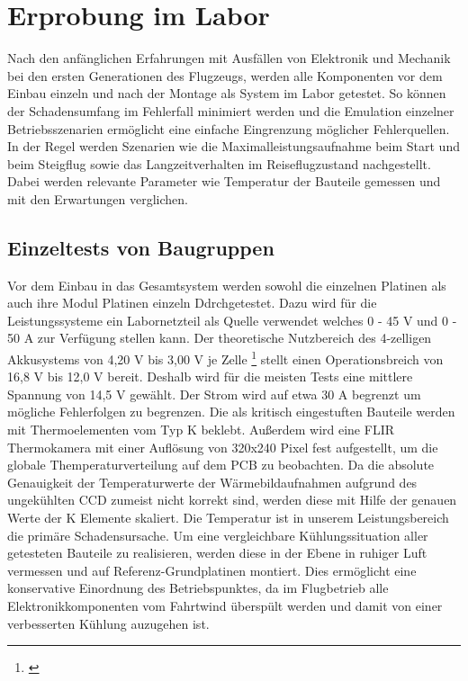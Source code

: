 \chapter{Erprobung im Labor}\label{cha:Erprobung im Labor}

Nach den anfänglichen Erfahrungen mit Ausfällen von Elektronik und Mechanik bei den ersten Generationen des Flugzeugs, werden alle Komponenten vor dem Einbau einzeln und nach der Montage als System im Labor getestet.
So können der Schadensumfang im Fehlerfall minimiert werden und die Emulation einzelner Betriebsszenarien ermöglicht eine einfache Eingrenzung möglicher Fehlerquellen.
In der Regel werden Szenarien wie die Maximalleistungsaufnahme beim Start und beim  Steigflug sowie das Langzeitverhalten im Reiseflugzustand nachgestellt. Dabei werden relevante Parameter wie Temperatur der Bauteile gemessen und mit den Erwartungen verglichen.

\section{Einzeltests von Baugruppen}

Vor dem Einbau in das Gesamtsystem werden sowohl die einzelnen Platinen als auch ihre Modul Platinen einzeln Ddrchgetestet.
Dazu wird für die Leistungssysteme ein Labornetzteil als Quelle verwendet welches 0 - 45 V und 0 - 50 A zur Verfügung stellen kann.
Der theoretische Nutzbereich des 4-zelligen Akkusystems von 4,20 V bis 3,00 V je Zelle \footnote{\cite[Seite~1.12f.]{Reddy2010}} stellt einen Operationsbreich von 16,8 V bis 12,0 V bereit. Deshalb wird für die meisten Tests eine mittlere Spannung von 14,5 V gewählt. Der Strom wird auf etwa 30 A begrenzt um mögliche Fehlerfolgen zu begrenzen.
Die als kritisch eingestuften Bauteile werden mit Thermoelementen vom Typ K beklebt. Außerdem wird eine FLIR Thermokamera mit einer Auflösung von 320x240 Pixel fest aufgestellt, um die globale Themperaturverteilung auf dem PCB zu beobachten.
Da die absolute Genauigkeit der Temperaturwerte der Wärmebildaufnahmen aufgrund des ungekühlten CCD zumeist nicht korrekt sind, werden diese mit Hilfe der genauen Werte der K Elemente skaliert.
Die Temperatur ist in unserem Leistungsbereich die primäre Schadensursache. 
Um eine vergleichbare Kühlungssituation aller getesteten Bauteile zu realisieren, werden diese in der Ebene in ruhiger Luft vermessen und auf Referenz-Grundplatinen montiert.
Dies ermöglicht eine konservative Einordnung des Betriebspunktes, da im Flugbetrieb alle Elektronikkomponenten vom Fahrtwind überspült werden und damit von einer verbesserten Kühlung auzugehen ist.

